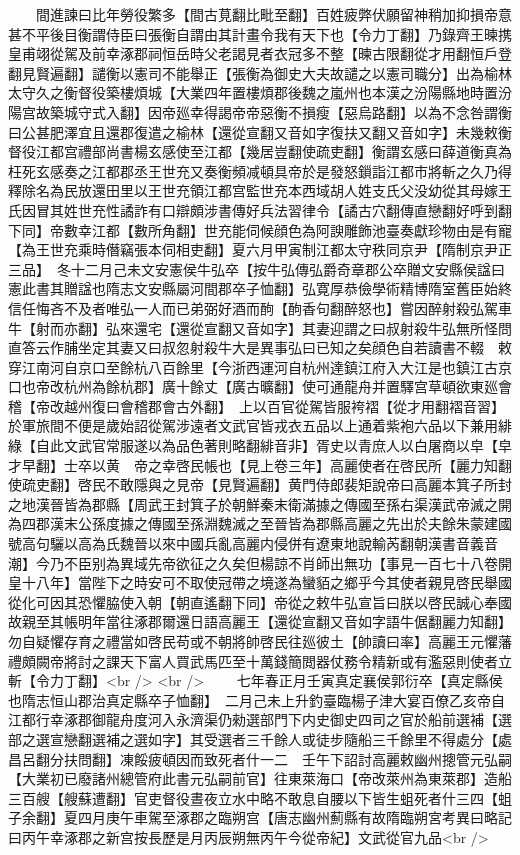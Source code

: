 　　間進諫曰比年勞役繁多【間古莧翻比毗至翻】百姓疲弊伏願留神稍加抑損帝意甚不平後目衡謂侍臣曰張衡自謂由其計畫令我有天下也【令力丁翻】乃錄齊王暕携皇甫翊從駕及前幸涿郡祠恒岳時父老謁見者衣冠多不整【暕古限翻從才用翻恒戶登翻見賢遍翻】譴衡以憲司不能舉正【張衡為御史大夫故譴之以憲司職分】出為榆林太守久之衡督役築樓煩城【大業四年置樓煩郡後魏之嵐州也本漢之汾陽縣地時置汾陽宫故築城守式入翻】因帝廵幸得謁帝帝惡衡不損瘦【惡烏路翻】以為不念咎謂衡曰公甚肥澤宜且還郡復遣之榆林【還從宣翻又音如字復扶又翻又音如字】未幾敕衡督役江都宫禮部尚書楊玄感使至江都【幾居豈翻使疏吏翻】衡謂玄感曰薛道衡真為枉死玄感奏之江都郡丞王世充又奏衡頻减頓具帝於是發怒鎻詣江都市將斬之久乃得釋除名為民放還田里以王世充領江都宫監世充本西域胡人姓支氏父没幼從其母嫁王氏因冒其姓世充性譎詐有口辯頗涉書傳好兵法習律令【譎古穴翻傳直戀翻好呼到翻下同】帝數幸江都【數所角翻】世充能伺候顔色為阿諛雕飾池臺奏獻珍物由是有寵【為王世充乘時僭竊張本伺相吏翻】夏六月甲寅制江都太守秩同京尹【隋制京尹正三品】　冬十二月己未文安憲侯牛弘卒【按牛弘傳弘爵奇章郡公卒贈文安縣侯諡曰憲此書其贈諡也隋志文安縣屬河間郡卒子恤翻】弘寛厚恭儉學術精博隋室舊臣始終信任悔吝不及者唯弘一人而已弟弼好酒而䣱【䣱香句翻醉怒也】嘗因醉射殺弘駕車牛【射而亦翻】弘來還宅【還從宣翻又音如字】其妻迎謂之曰叔射殺牛弘無所怪問直答云作脯坐定其妻又曰叔忽射殺牛大是異事弘曰已知之矣顔色自若讀書不輟　敕穿江南河自京口至餘杭八百餘里【今浙西運河自杭州達鎮江府入大江是也鎮江古京口也帝改杭州為餘杭郡】廣十餘丈【廣古曠翻】使可通龍舟并置驛宫草頓欲東廵會稽【帝改越州復曰會稽郡會古外翻】　上以百官從駕皆服袴褶【從才用翻褶音習】於軍旅間不便是歲始詔從駕涉遠者文武官皆戎衣五品以上通着紫袍六品以下兼用緋綠【自此文武官常服遂以為品色著則略翻緋音非】胥史以青庶人以白屠商以皁【皁才早翻】士卒以黄　帝之幸啓民帳也【見上卷三年】高麗使者在啓民所【麗力知翻使疏吏翻】啓民不敢隱與之見帝【見賢遍翻】黄門侍郎裴矩說帝曰高麗本箕子所封之地漢晉皆為郡縣【周武王封箕子於朝鮮秦末衛滿據之傳國至孫右渠漢武帝滅之開為四郡漢末公孫度據之傳國至孫淵魏滅之至晉皆為郡縣高麗之先出於夫餘朱蒙建國號高句驪以高為氏魏晉以來中國兵亂高麗内侵併有遼東地說輸芮翻朝漢書音義音潮】今乃不臣别為異域先帝欲征之久矣但楊諒不肖師出無功【事見一百七十八卷開皇十八年】當陛下之時安可不取使冠帶之境遂為蠻貊之鄉乎今其使者親見啓民舉國從化可因其恐懼脇使入朝【朝直遙翻下同】帝從之敕牛弘宣旨曰朕以啓民誠心奉國故親至其帳明年當往涿郡爾還日語高麗王【還從宣翻又音如字語牛倨翻麗力知翻】勿自疑懼存育之禮當如啓民苟或不朝將帥啓民往廵彼土【帥讀曰率】高麗王元懼藩禮頗闕帝將討之課天下富人買武馬匹至十萬錢簡閲器仗務令精新或有濫惡則使者立斬【令力丁翻】<br />
<br />
　　七年春正月壬寅真定襄侯郭衍卒【真定縣侯也隋志恒山郡治真定縣卒子恤翻】　二月己未上升釣臺臨楊子津大宴百僚乙亥帝自江都行幸涿郡御龍舟度河入永濟渠仍勑選部門下内史御史四司之官於船前選補【選部之選宣戀翻選補之選如字】其受選者三千餘人或徒步隨船三千餘里不得處分【處昌呂翻分扶問翻】凍餒疲頓因而致死者什一二　壬午下詔討高麗敕幽州摠管元弘嗣【大業初已廢諸州總管府此書元弘嗣前官】往東萊海口【帝改萊州為東萊郡】造船三百艘【艘蘇遭翻】官吏督役晝夜立水中略不敢息自腰以下皆生蛆死者什三四【蛆子余翻】夏四月庚午車駕至涿郡之臨朔宫【唐志幽州薊縣有故隋臨朔宮考異曰略記曰丙午幸涿郡之新宫按長歷是月丙辰朔無丙午今從帝紀】文武從官九品<br />
